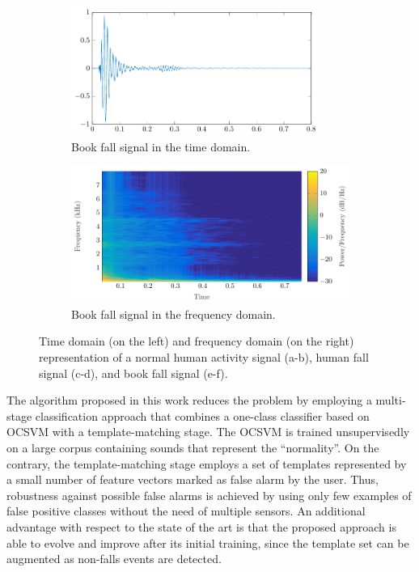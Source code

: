 \begin{figure}[htbp]
	\begin{subfigure}[htb]{0.5\columnwidth}
		\centering
		\includegraphics[width=0.9\textwidth]{img/cin/book_time_.pdf}
		\caption{Book fall signal in the time domain.}\label{fig:time_bf}
	\end{subfigure}%
	\begin{subfigure}[htb]{0.5\columnwidth}
		\centering
		\includegraphics[width=\textwidth]{img/cin/book_freq_.pdf}
		\caption{Book fall signal in the frequency domain.}\label{fig:spec_bf}
	\end{subfigure}
	\caption{Time domain (on the left) and frequency domain (on the right) representation of a normal human activity signal (a-b), human fall signal (c-d), and book fall signal (e-f).}\label{fig:waveforms}
\end{figure}

The algorithm proposed in this work reduces the problem by employing a multi-stage classification approach that combines a one-class classifier based on OCSVM with a template-matching stage. The OCSVM is trained unsupervisedly on a large corpus containing sounds that represent the ``normality''. On the contrary, the template-matching stage employs a set of templates represented by a small number of feature vectors marked as false alarm by the user. Thus, robustness against possible false alarms is achieved by using only few examples of false positive classes without the need of multiple sensors. An additional advantage with respect to the state of the art is that the proposed approach is able to evolve and improve after its initial training, since the template set can be augmented as non-falls events are detected.

